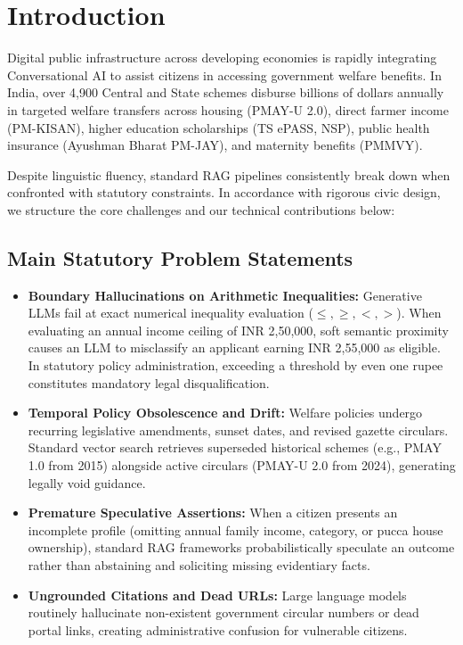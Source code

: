 \documentclass[conference]{IEEEtran}
\begin{document}
\section{Introduction}
Digital public infrastructure across developing economies is rapidly integrating Conversational AI to assist citizens in accessing government welfare benefits. In India, over 4,900 Central and State schemes disburse billions of dollars annually in targeted welfare transfers across housing (PMAY-U 2.0), direct farmer income (PM-KISAN), higher education scholarships (TS ePASS, NSP), public health insurance (Ayushman Bharat PM-JAY), and maternity benefits (PMMVY).

Despite linguistic fluency, standard RAG pipelines consistently break down when confronted with statutory constraints. In accordance with rigorous civic design, we structure the core challenges and our technical contributions below:

\subsection{Main Statutory Problem Statements}
\begin{itemize}
    \item \textbf{Boundary Hallucinations on Arithmetic Inequalities:} Generative LLMs fail at exact numerical inequality evaluation ($\le, \ge, <, >$). When evaluating an annual income ceiling of INR 2,50,000, soft semantic proximity causes an LLM to misclassify an applicant earning INR 2,55,000 as eligible. In statutory policy administration, exceeding a threshold by even one rupee constitutes mandatory legal disqualification.
    \item \textbf{Temporal Policy Obsolescence and Drift:} Welfare policies undergo recurring legislative amendments, sunset dates, and revised gazette circulars. Standard vector search retrieves superseded historical schemes (e.g., PMAY 1.0 from 2015) alongside active circulars (PMAY-U 2.0 from 2024), generating legally void guidance.
    \item \textbf{Premature Speculative Assertions:} When a citizen presents an incomplete profile (omitting annual family income, category, or pucca house ownership), standard RAG frameworks probabilistically speculate an outcome rather than abstaining and soliciting missing evidentiary facts.
    \item \textbf{Ungrounded Citations and Dead URLs:} Large language models routinely hallucinate non-existent government circular numbers or dead portal links, creating administrative confusion for vulnerable citizens.
\end{itemize}
\end{document}
